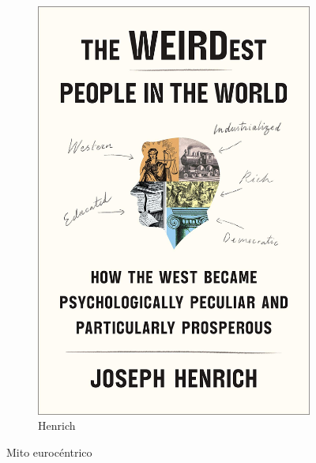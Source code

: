 \documentclass[a4paper,10pt]{book}
\newif\ifes
\newcommand{\es}[1]{\ifes#1\fi}
\begin{document}
\begin{figure}[ht!]
\begin{subfigure}[b]{0.25\textwidth}
    \includegraphics[width=1\linewidth]{static/henrich}
    \caption{Henrich}
    \label{}
    \end{subfigure}
    \caption{Mito eurocéntrico}
    \label{fig:mito}
\end{figure}

\es{El mito eurocéntrico proyecta a la europa feudal en la cultura griega y judeo-cristianismo (ambos fenómenos de origen oriental) con pretensión de explicación histórico-mundial: ``la historia universal va del Oriente al Occidente; Europa es el centro absoluto de la historia universal'' dice Hegel~\cite{hegel}.}%
%
\es{Este relato falso de la historia está vigente todavía en la principales univerisidades del mundo occidental, desde Harvard a la Universidas de Buenos Aires, pero también en universidades de África, del mundo Árabe, India y Asia.}%
%
\es{Desde Hegel hasta la fecha, las explicaciones eurocéntricas intentan explicar la proposperidad actual de occidente a través de una ``causa interna'': el ``espíritu protestante'' de Weber \cite{weber}, la ``mentalidad burguesa'' de Romero \cite{romero}, o más recientemente el ``sistema de parentezco''\cite{henrich} de Henrich.}%
\end{document}
